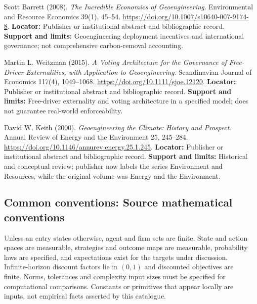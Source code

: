\documentclass[11pt,a4paper]{article}
\begin{document}
\begin{enumerate}[label={[\textnormal{S}\arabic*]},leftmargin=*]

\item Scott Barrett (2008). \emph{The Incredible Economics of Geoengineering}. Environmental and Resource Economics 39(1), 45–54. \url{https://doi.org/10.1007/s10640-007-9174-8}. \textbf{Locator:} Publisher or institutional abstract and bibliographic record. \textbf{Support and limits:} Geoengineering deployment incentives and international governance; not comprehensive carbon-removal accounting.

\item Martin L. Weitzman (2015). \emph{A Voting Architecture for the Governance of Free-Driver Externalities, with Application to Geoengineering}. Scandinavian Journal of Economics 117(4), 1049–1068. \url{https://doi.org/10.1111/sjoe.12120}. \textbf{Locator:} Publisher or institutional abstract and bibliographic record. \textbf{Support and limits:} Free-driver externality and voting architecture in a specified model; does not guarantee real-world enforceability.

\item David W. Keith (2000). \emph{Geoengineering the Climate: History and Prospect}. Annual Review of Energy and the Environment 25, 245–284. \url{https://doi.org/10.1146/annurev.energy.25.1.245}. \textbf{Locator:} Publisher or institutional abstract and bibliographic record. \textbf{Support and limits:} Historical and conceptual review; publisher now labels the series Environment and Resources, while the original volume was Energy and the Environment.

\end{enumerate}

\subsection*{Common conventions: Source mathematical conventions}

Unless an entry states otherwise, agent and firm sets are finite. State and action spaces are measurable, strategies and outcome maps are measurable, probability laws are specified, and expectations exist for the targets under discussion. Infinite-horizon discount factors lie in $(0,1)$ and discounted objectives are finite. Norms, tolerances and complexity input sizes must be specified for computational comparisons. Constants or primitives that appear locally are inputs, not empirical facts asserted by this catalogue.
\end{document}
